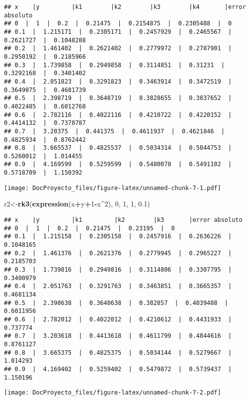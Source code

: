 \documentclass[]{article}
\newenvironment{Shaded}{\begin{snugshade}}{\end{snugshade}}
\newcommand{\KeywordTok}[1]{\textcolor[rgb]{0.13,0.29,0.53}{\textbf{#1}}}
\newcommand{\DecValTok}[1]{\textcolor[rgb]{0.00,0.00,0.81}{#1}}
\newcommand{\FloatTok}[1]{\textcolor[rgb]{0.00,0.00,0.81}{#1}}
\newcommand{\OperatorTok}[1]{\textcolor[rgb]{0.81,0.36,0.00}{\textbf{#1}}}
\newcommand{\NormalTok}[1]{#1}
\begin{document}
\begin{verbatim}
## x    |y         |k1        |k2        |k3        |k4       |error absoluto
## 0  |  1  |  0.2  |  0.21475  |  0.2154875  |  0.2305488  |  0 
## 0.1  |  1.215171  |  0.2305171  |  0.2457929  |  0.2465567  |  0.2621727  |  0.1048288 
## 0.2  |  1.461402  |  0.2621402  |  0.2779972  |  0.2787901  |  0.2950192  |  0.2185966 
## 0.3  |  1.739858  |  0.2949858  |  0.3114851  |  0.31231  |  0.3292168  |  0.3401402 
## 0.4  |  2.051823  |  0.3291823  |  0.3463914  |  0.3472519  |  0.3649075  |  0.4681739 
## 0.5  |  2.398719  |  0.3648719  |  0.3828655  |  0.3837652  |  0.4022485  |  0.6012768 
## 0.6  |  2.782116  |  0.4022116  |  0.4210722  |  0.4220152  |  0.4414132  |  0.7378787 
## 0.7  |  3.20375  |  0.441375  |  0.4611937  |  0.4621846  |  0.4825934  |  0.8762442 
## 0.8  |  3.665537  |  0.4825537  |  0.5034314  |  0.5044753  |  0.5260012  |  1.014455 
## 0.9  |  4.169599  |  0.5259599  |  0.5480078  |  0.5491102  |  0.5718709  |  1.150392
\end{verbatim}

\texttt{[image: DocProyecto\_files/figure-latex/unnamed-chunk-7-1.pdf]}

\begin{Shaded}
\begin{Highlighting}[]
\NormalTok{r2<-}\KeywordTok{rk3}\NormalTok{(}\KeywordTok{expression}\NormalTok{(x}\OperatorTok{+}\NormalTok{y}\OperatorTok{+}\DecValTok{1}\OperatorTok{-}\NormalTok{x}\OperatorTok{^}\DecValTok{2}\NormalTok{), }\DecValTok{0}\NormalTok{, }\DecValTok{1}\NormalTok{, }\DecValTok{1}\NormalTok{, }\FloatTok{0.1}\NormalTok{)}
\end{Highlighting}
\end{Shaded}

\begin{verbatim}
## x    |y         |k1         |k2        |k3       |error absoluto
## 0  |  1  |  0.2  |  0.21475  |  0.23195  |  0 
## 0.1  |  1.215158  |  0.2305158  |  0.2457916  |  0.2636226  |  0.1048165 
## 0.2  |  1.461376  |  0.2621376  |  0.2779945  |  0.2965227  |  0.2185703 
## 0.3  |  1.739816  |  0.2949816  |  0.3114806  |  0.3307795  |  0.3400979 
## 0.4  |  2.051763  |  0.3291763  |  0.3463851  |  0.3665357  |  0.4681134 
## 0.5  |  2.398638  |  0.3648638  |  0.382857  |  0.4039488  |  0.6011956 
## 0.6  |  2.782012  |  0.4022012  |  0.4210612  |  0.4431933  |  0.737774 
## 0.7  |  3.203618  |  0.4413618  |  0.4611799  |  0.4844616  |  0.8761127 
## 0.8  |  3.665375  |  0.4825375  |  0.5034144  |  0.5279667  |  1.014293 
## 0.9  |  4.169402  |  0.5259402  |  0.5479872  |  0.5739437  |  1.150196
\end{verbatim}

\texttt{[image: DocProyecto\_files/figure-latex/unnamed-chunk-7-2.pdf]}
\end{document}
